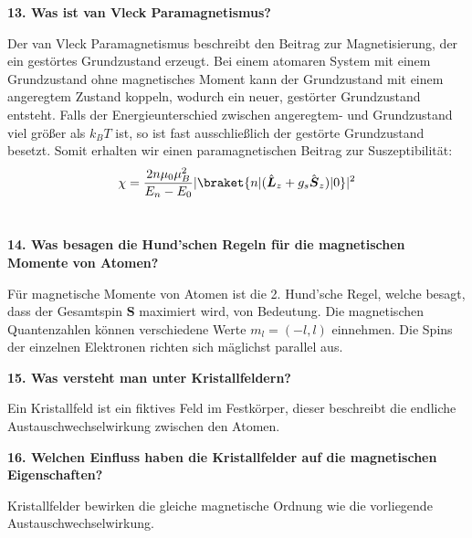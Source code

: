 \noindent\textbf{13. Was ist van Vleck Paramagnetismus?}\\
\begin{addmargin}[25pt]{0pt}
Der van Vleck Paramagnetismus beschreibt den Beitrag zur Magnetisierung, der ein gestörtes Grundzustand erzeugt. Bei einem atomaren System mit einem Grundzustand ohne magnetisches Moment kann der Grundzustand mit einem angeregtem Zustand koppeln, wodurch ein neuer, gestörter Grundzustand entsteht. Falls der Energieunterschied zwischen angeregtem- und Grundzustand viel größer als $k_{B}T$ ist, so ist fast ausschließlich der gestörte Grundzustand besetzt. Somit erhalten wir einen paramagnetischen Beitrag zur Suszeptibilität:
\begin{equation}
    \chi = \frac{2n\mu_{0}\mu_{B}^2}{E_{n}-E_{0}}|\braket{n|(\hat{\boldsymbol{L}}_{z}+g_{s}\hat{\boldsymbol{S}}_{z})|0}|^2
    \label{eq:van-Vleck}
\end{equation}\\
\end{addmargin}

\noindent\textbf{14. Was besagen die Hund'schen Regeln für die magnetischen Momente von Atomen?}\\
\begin{addmargin}[25pt]{0pt}
Für magnetische Momente von Atomen ist die 2. Hund'sche Regel, welche besagt, dass der Gesamtspin $\boldsymbol{S}$ maximiert wird, von Bedeutung. Die magnetischen Quantenzahlen können verschiedene Werte $m_{l} = (-l,l)$ einnehmen. Die Spins der einzelnen Elektronen richten sich mäglichst parallel aus.\\
\end{addmargin}

\noindent\textbf{15. Was versteht man unter Kristallfeldern?}\\
\begin{addmargin}[25pt]{0pt}
Ein Kristallfeld ist ein fiktives Feld im Festkörper, dieser beschreibt die endliche Austauschwechselwirkung zwischen den Atomen.  \\
\end{addmargin}

\noindent\textbf{16. Welchen Einfluss haben die Kristallfelder auf die magnetischen Eigenschaften?}\\
\begin{addmargin}[25pt]{0pt}
Kristallfelder bewirken die gleiche magnetische Ordnung wie die vorliegende Austauschwechselwirkung.  \\
\end{addmargin}

